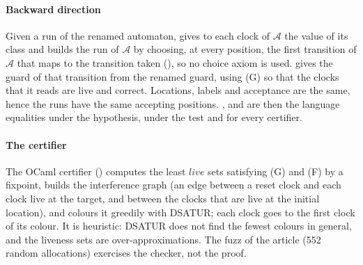 \paragraph{Backward direction} Given a run of the renamed automaton,  gives to each clock of $\mathcal A$ the value of its class and  builds the run of $\mathcal A$ by choosing, at every position, the first transition of $\mathcal A$ that maps to the transition taken (), so no choice axiom is used.  gives the guard of that transition from the renamed guard, using (G) so that the clocks that it reads are live and correct. Locations, labels and acceptance are the same, hence the runs have the same accepting positions. ,  and  are then the language equalities under the hypothesis, under the test and for every certifier.

\paragraph{The certifier} The OCaml certifier () computes the least $\mathit{live}$ sets satisfying (G) and (F) by a fixpoint, builds the interference graph (an edge between a reset clock and each clock live at the target, and between the clocks that are live at the initial location), and colours it greedily with DSATUR; each clock goes to the first clock of its colour. It is heuristic: DSATUR does not find the fewest colours in general, and the liveness sets are over-approximations. The fuzz of the article (552 random allocations) exercises the checker, not the proof.

